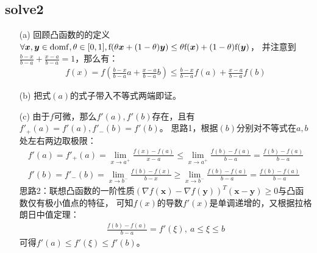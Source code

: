 \documentclass[12pt,a4paper]{ctexart}
\newcommand{\bs}[1]{\boldsymbol{#1}}
\begin{document}
\subsection*{solve2}
\begin{itemize}
    \item[(a)]回顾凸函数的的定义$\forall \bs{x},\bs{y} \in \rm{domf},\theta \in [0,1],f(\theta \bs{x}+(1-\theta)\bs{y}) \leq \theta f(\bs{x})+(1-\theta)f(\bs{y})$，
    并注意到$\frac{b-x}{b-a}+\frac{x-a}{b-a}=1$，那么有：
    \begin{align*}
        f(x)=f(\frac{b-x}{b-a} a+\frac{x-a}{b-a} b)\leq \frac{b-x}{b-a}f(a)+\frac{x-a}{b-a}f(b)
    \end{align*}
    \item[(b)] 把式$(a)$的式子带入不等式两端即证。
    \item[(c)] 由于$f$可微，那么$f'(a),f'(b)$存在，且有$f'_+(a)=f'(a),f'_-(b)=f'(b)$。
    思路1，根据$(b)$分别对不等式在$a,b$处左右两边取极限：
    \begin{align*}
        f'(a)=f'_+(a)=\lim\limits_{x \to a^+}\frac{f(x)-f(a)}{x-a} \leq \lim\limits_{x \to a^+}\frac{f(b)-f(a)}{b-a}=\frac{f(b)-f(a)}{b-a}\\
        f'(b)=f'_-(b)=\lim\limits_{x \to b^-}\frac{f(b)-f(x)}{b-x} \geq \lim\limits_{x \to b^-}\frac{f(b)-f(a)}{b-a}=\frac{f(b)-f(a)}{b-a} 
    \end{align*}
    思路2：联想凸函数的一阶性质$(\nabla f(\bs{x})-\nabla f(\bs{y}))^T(\bs{x}-\bs{y}) \geq 0$与凸函数仅有极小值点的特征，
    可知$f(x)$的导数$f'(x)$是单调递增的，又根据拉格朗日中值定理：
    \begin{align*}
        \frac{f(b)-f(a)}{b-a}=f'(\xi),\ a \leq \xi \leq b
    \end{align*}
    可得$f'(a) \leq f'(\xi) \le f'(b)$。

\end{itemize}
\end{document}

